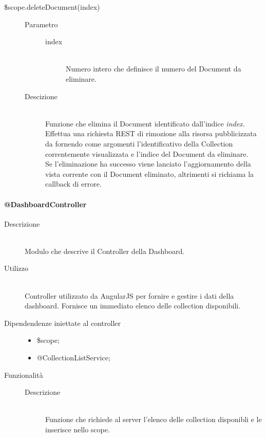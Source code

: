 \begin{description}
\begin{description}
  \item[\$scope.deleteDocument(index)] \hfill 
  \begin{description}
  	\item[Parametro] \hfill
  	\begin{description}
  		\item[index] \hfill \\
  		Numero intero che definisce il numero del Document da eliminare.
  	\end{description}
  	\item[Descizione] \hfill \\
  Funzione che elimina il Document identificato dall'indice \textit{index}. Effettua una richiesta REST di rimozione alla risorsa pubblicizzata da  fornendo come argomenti l'identificativo della Collection correntemente visualizzata e l'indice del Document da eliminare. \\
  Se l'eliminazione ha successo viene lanciato l'aggiornamento della vista corrente con il Document eliminato, altrimenti si richiama la callback di errore.
  \end{description}
  
 \end{description}
\end{description}

\paragraph{@DashboardController}
\begin{description}
 \item[Descrizione] \hfill \\
 Modulo che descrive il Controller della Dashboard.
 
 \item[Utilizzo] \hfill \\
 Controller utilizzato da AngularJS per fornire e gestire i dati della dashboard.
Fornisce un immediato elenco delle collection disponibili.
 
 \item[Dipendendenze iniettate al controller] \hfill
 \begin{itemize}
  \item \$scope;
  \item @CollectionListService;
 \end{itemize}
 
 \item[Funzionalità]
 \begin{mldescription}
  \begin{description}
  	\item[Descrizione] \hfill \\
    Funzione che richiede al server l'elenco delle collection disponibli e le inserisce nello scope.
  \end{description}
 \end{mldescription}
\end{description}

